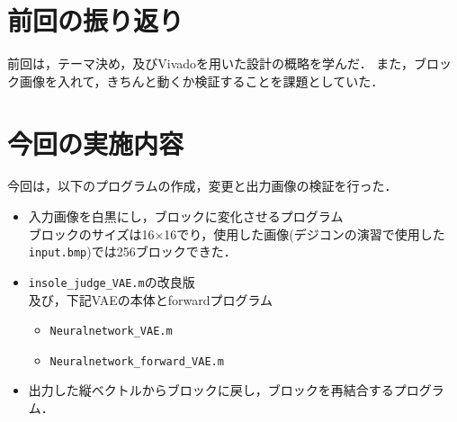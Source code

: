 \documentclass[twocolumn, a4j]{jsarticle}
\begin{document}

\section{前回の振り返り}
前回は，テーマ決め，及びVivadoを用いた設計の概略を学んだ．
また，ブロック画像を入れて，きちんと動くか検証することを課題としていた．

\section{今回の実施内容}
今回は，以下のプログラムの作成，変更と出力画像の検証を行った．
\begin{itemize}
  \item 入力画像を白黒にし，ブロックに変化させるプログラム
  \\ブロックのサイズは16×16でり，使用した画像(デジコンの演習で使用した\texttt{input.bmp})では256ブロックできた．
  \item \texttt{insole\_judge\_VAE.m}の改良版
  \\及び，下記VAEの本体とforwardプログラム
  \begin{itemize}
    \item \texttt{Neuralnetwork\_VAE.m}
    \item \texttt{Neuralnetwork\_forward\_VAE.m}
  \end{itemize} 
  \item 出力した縦ベクトルからブロックに戻し，ブロックを再結合するプログラム．
\end{itemize}
\end{document}
